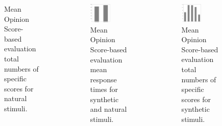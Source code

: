 \documentclass[a4paper,9pt]{beamer}
\theoremstyle{mytheoremstyle}
\begin{document}
\begin{frame}
\begin{columns}
\begin{figure}
\begin{center}
\end{center}
\caption{Mean Opinion Score-based evaluation total numbers of specific scores for natural stimuli.}
\end{figure}
\begin{figure}
\begin{center}
  \includegraphics[width=0.5\textwidth]{res/MOS_stimulus_type_mean_response_time}
\end{center}
	\caption{Mean Opinion Score-based evaluation mean response times for synthetic and natural stimuli.}
\end{figure}
\begin{figure}
\begin{center}
\includegraphics[width=0.5\textwidth]{res/MOS_number_of_scores_synthetic_stimuli}
\end{center}
\caption{Mean Opinion Score-based evaluation total numbers of specific scores for synthetic stimuli.}
\end{figure}
\end{columns}
\end{frame}
\end{document}
